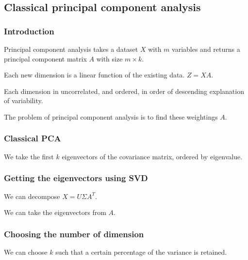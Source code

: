 
\subsection{Classical principal component analysis}

\subsubsection{Introduction}

Principal component analysis takes a dataset \(X\) with \(m\) variables and returns a principal component matrix \(A\) with size \(m\times k\).

Each new dimension is a linear function of the existing data. \(Z=XA\).

Each dimension in uncorrelated, and ordered, in order of descending explanation of variability.

The problem of principal component analysis is to find these weightings \(A\).

\subsubsection{Classical PCA}

We take the first \(k\) eigenvectors of the covariance matrix, ordered by eigenvalue.

\subsubsection{Getting the eigenvectors using SVD}

We can decompose \(X=U\Sigma A^T\).

We can take the eigenvectors from \(A\).

\subsubsection{Choosing the number of dimension}

We can choose \(k\) such that a certain percentage of the variance is retained.

